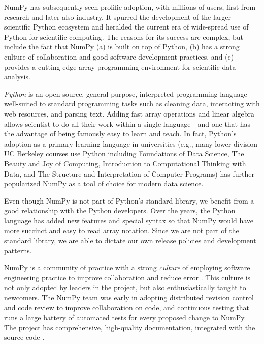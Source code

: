 NumPy has subsequently seen prolific adoption, with millions of users,
first from research and later also industry.
It spurred the development of the larger scientific Python ecosystem and
heralded the current era of wide-spread use of Python for scientific computing.
The reasons for its success are complex, but include the fact that
NumPy (a) is built on top of Python,
(b) has a strong culture of collaboration and good software development practices, and
(c) provides a cutting-edge array programming environment for scientific data analysis.

\emph{Python} is an open source, general-purpose, interpreted programming language
well-suited to standard programming tasks such as cleaning data,
interacting with web resources, and parsing text.
Adding fast array operations and linear algebra allows scientist to do all
their work within a single language---and one that has the advantage of
being famously easy to learn and teach.
In fact, Python's adoption as a primary learning language in universities
(e.g., many lower division UC Berkeley courses use Python including
Foundations of Data Science,
The Beauty and Joy of Computing,
Introduction to Computational Thinking with Data,
and The Structure and Interpretation of Computer Programs) has
further popularized NumPy as a tool of choice for modern data science.

Even though NumPy is not part of Python's standard library,
we benefit from a good relationship with the Python developers.
Over the years, the Python language has added new features and
special syntax so that NumPy would have more succinct and 
easy to read array notation.
Since we are not part of the standard library, we are able to
dictate our own release policies and development patterns.

NumPy is a community of practice with a strong \emph{culture} of
employing software engineering practice to improve collaboration and
reduce error \cite{millman2014developing}.  This culture is not only
adopted by leaders in the project, but also enthusiastically taught to
newcomers. The NumPy team was early in adopting distributed revision
control and code review to improve collaboration on code, and
continuous testing that runs a large battery of automated tests for
every proposed change to NumPy.  The project has comprehensive,
high-quality documentation, integrated with the source
code \cite{vanderwalt2008scipy,harrington2008scipy,harrington2009scipy}.

